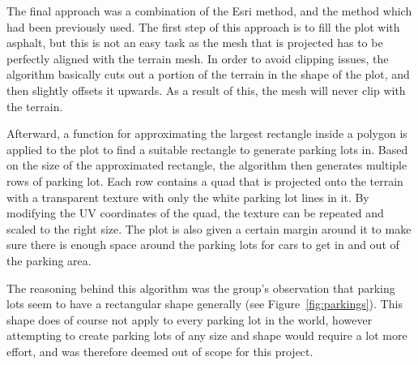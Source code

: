 The final approach was a combination of the Esri method, and the method which had been previously used. 
The first step of this approach is to fill the plot with asphalt, but this is not an easy task as the mesh that is projected has to be perfectly aligned with the terrain mesh.
In order to avoid clipping issues, the algorithm basically cuts out a portion of the terrain in the shape of the plot, and then slightly offsets it upwards.
As a result of this, the mesh will never clip with the terrain. 

Afterward, a function for approximating the largest rectangle inside a polygon is applied to the plot to find a suitable rectangle to generate parking lots in.
Based on the size of the approximated rectangle, the algorithm then generates multiple rows of parking lot.
Each row contains a quad that is projected onto the terrain with a transparent texture with only the white parking lot lines in it.
By modifying the UV coordinates of the quad, the texture can be repeated and scaled to the right size.
The plot is also given a certain margin around it to make sure there is enough space around the parking lots for cars to get in and out of the parking area.

The reasoning behind this algorithm was the group's observation that parking lots seem to have a rectangular shape generally (see Figure~\ref{fig:parkings}).
This shape does of course not apply to every parking lot in the world, however attempting to create parking lots of any size and shape would require a lot more effort, and was therefore deemed out of scope for this project. 

